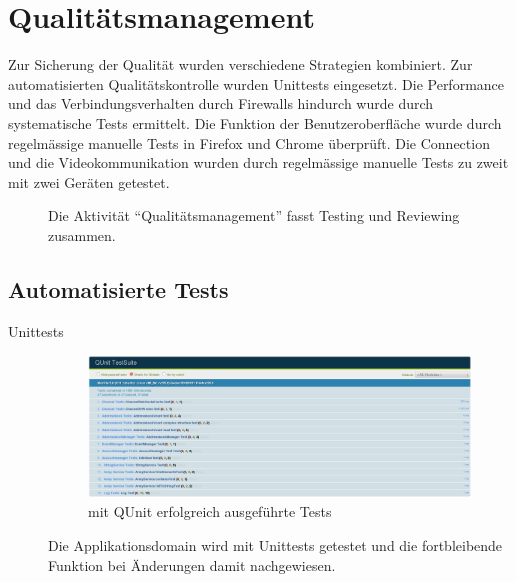 \chapter{Qualitätsmanagement}
	Zur Sicherung der Qualität wurden verschiedene Strategien kombiniert. Zur automatisierten Qualitätskontrolle wurden Unittests eingesetzt. Die Performance und das Verbindungsverhalten durch Firewalls hindurch wurde durch systematische Tests ermittelt. Die Funktion der Benutzeroberfläche wurde durch regelmässige manuelle Tests in Firefox und Chrome überprüft.
	Die Connection und die Videokommunikation wurden durch regelmässige manuelle Tests zu zweit mit zwei Geräten getestet.
	
	\begin{figure}[H]
		\centering
		{\tiny
		}
		\caption{Die Aktivität "`Qualitätsmanagement"' fasst Testing und Reviewing
		zusammen.}
	\end{figure}

	\section{Automatisierte Tests}
		\begin{description}
			\item[Unittests]		
			\begin{figure}[H]
				\centering
				\includegraphics[width=1\textwidth]{../qualityManagement/unittesting.png}
				\caption{mit QUnit erfolgreich ausgeführte Tests}
				\label{unittests}
			\end{figure}
			Die Applikationsdomain wird mit Unittests getestet und die fortbleibende
			Funktion bei Änderungen damit nachgewiesen.
		\end{description}
		
